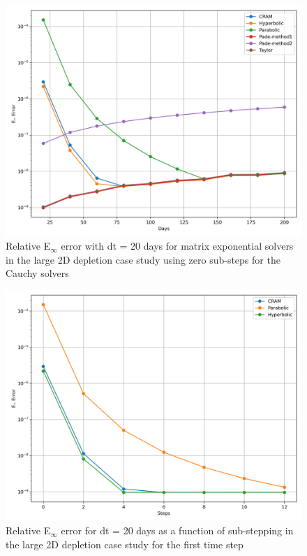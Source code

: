 \clearpage

\begin{figure}[p]
    \centering
    \includegraphics[width=5in]{images/chapter-5/caseStudies/large2DDepletion/msrLarge2DDepletionEinfErrorerrorSteps0.png}
    \caption{Relative E$_{\infty}$ error with dt = 20 days for matrix exponential solvers in the large 2D depletion case study using zero sub-steps for the Cauchy solvers}
    \label{fig:large_2D_depletion_Einf_steps0}
\end{figure}

\clearpage

\begin{figure}[p]
    \centering
    \includegraphics[width=5in]{images/chapter-5/caseStudies/large2DDepletion/msrLarge2DDepletionEinfErrorerrorWithSteps.png}
    \caption{Relative E$_{\infty}$ error for dt = 20 days as a function of sub-stepping in the large 2D depletion case study for the first time step}
    \label{fig:large_2D_depletion_Einf_with_substeps}
\end{figure}

